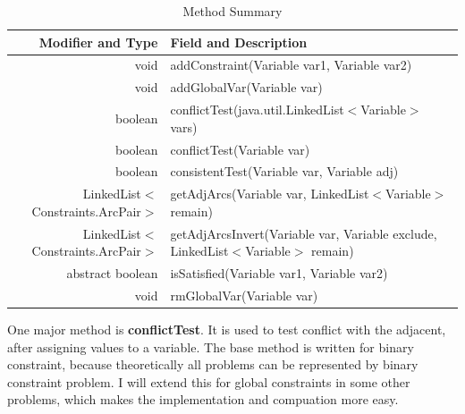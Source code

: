 \documentclass{article}
\begin{document}
\begin{table}[h]
\begin{center}
  \begin{tabular}{ |r | l | }
    \hline
    Modifier and Type & Field and Description \\ \hline
void	&addConstraint(Variable var1, Variable var2)                                                                                   \\ \hline
void	&addGlobalVar(Variable var)                                                                                                    \\ \hline
boolean	&conflictTest(java.util.LinkedList$<$Variable$>$ vars)                                                                           \\ \hline
boolean	&conflictTest(Variable var)                                                                                                  \\ \hline
boolean	&consistentTest(Variable var, Variable adj)                                                                                  \\ \hline
LinkedList$<$Constraints.ArcPair$>$&	getAdjArcs(Variable var, LinkedList$<$Variable$>$ remain)                          \\ \hline
LinkedList$<$Constraints.ArcPair$>$	&getAdjArcsInvert(Variable var, Variable exclude, LinkedList$<$Variable$>$ remain)   \\ \hline
abstract boolean&	isSatisfied(Variable var1, Variable var2)                                                                          \\ \hline
void	&rmGlobalVar(Variable var)                                                                                                     \\ \hline

  \end{tabular}
\caption{Method Summary}
\end{center}
\end{table}

One major method is \textbf{conflictTest}. It is used to test conflict with the adjacent, after assigning values to a variable. The base method is written for binary constraint, because theoretically all problems can be represented by binary constraint problem. I will extend this for global constraints in some other problems, which makes the implementation and compuation more easy.
\end{document}
